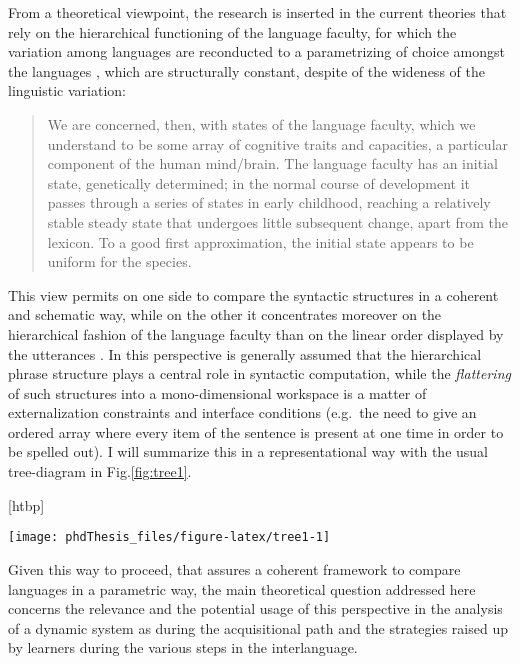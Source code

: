 \documentclass[a4paper,twoside,12pt,chapterprefix=false,bibliography=totocnumbered,listof=flat]{scrbook}
\makeatletter
\def\fps@figure{htbp}
\renewenvironment{figure}[1][\fps@figure]{
  \edef\@tempa{\noexpand\@float{figure}[#1]} 
  \@tempa
  \sffamily
}{
  \end@float
}
\theoremstyle{definition}
\theoremstyle{definition}
\theoremstyle{definition}
\theoremstyle{remark}
\makeatother
\begin{document}
From a theoretical viewpoint, the research is inserted in the current
theories that rely on the hierarchical functioning of the language
faculty, for which the variation among languages are reconducted to a
parametrizing of choice amongst the languages
\citep{adger2013, chomsky1995, chomsky1998, chomsky2013, chomsky2015, rizzi2013},
which are structurally constant, despite of the wideness of the
linguistic variation:

\begin{quote}
We are concerned, then, with states of the language faculty, which we
understand to be some array of cognitive traits and capacities, a
particular component of the human mind/brain. The language faculty has
an initial state, genetically determined; in the normal course of
development it passes through a series of states in early childhood,
reaching a relatively stable steady state that undergoes little
subsequent change, apart from the lexicon. To a good first
approximation, the initial state appears to be uniform for the species.

\citep{chomsky1995}
\end{quote}

This view permits on one side to compare the syntactic structures in a
coherent and schematic way, while on the other it concentrates moreover
on the hierarchical fashion of the language faculty than on the linear
order displayed by the utterances \citep{kayne1994, moro2000}. In this
perspective is generally assumed that the hierarchical phrase structure
plays a central role in syntactic computation, while the
\emph{flattering} of such structures into a mono-dimensional workspace
is a matter of externalization constraints and interface conditions
(e.g.~the need to give an ordered array where every item of the sentence
is present at one time in order to be spelled out). I will summarize
this in a representational way with the usual tree-diagram in
Fig.\ref{fig:tree1}.

\begin{figure}

{\centering \texttt{[image: phdThesis\_files/figure-latex/tree1-1]} 

}

\caption{Structural representation of a simple sentence}\label{fig:tree1}
\end{figure}

Given this way to proceed, that assures a coherent framework to compare
languages in a parametric way, the main theoretical question addressed
here concerns the relevance and the potential usage of this perspective
in the analysis of a dynamic system as during the acquisitional path and
the strategies raised up by learners during the various steps in the
interlanguage.
\end{document}
